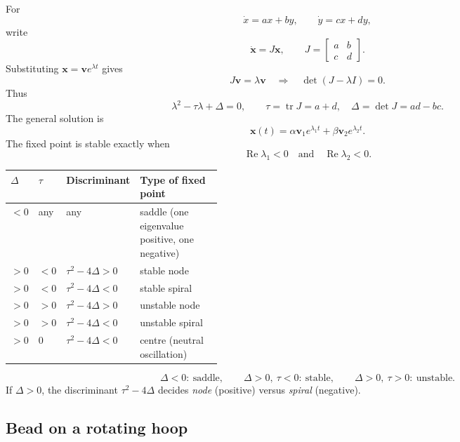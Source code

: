 \documentclass[10.5pt,a4paper]{article}
\newcommand{\x}{\mathbf{x}}
\begin{document}
For
\[
\dot x=ax+by,\qquad \dot y=cx+dy,
\]
write
\[
\dot{\x}=J\x,\qquad
J=\begin{bmatrix}a&b\\c&d\end{bmatrix}.
\]
Substituting \(\x=\mathbf v e^{\lambda t}\) gives
\[
J\mathbf v=\lambda\mathbf v
\quad\Longrightarrow\quad
\det(J-\lambda I)=0.
\]
Thus
\[
\lambda^2-\tau\lambda+\Delta=0,
\qquad
\tau=\operatorname{tr}J=a+d,\quad
\Delta=\det J=ad-bc.
\]
The general solution is
\[
\x(t)=\alpha\mathbf v_1e^{\lambda_1t}+\beta\mathbf v_2e^{\lambda_2t}.
\]
The fixed point is stable exactly when
\[
\operatorname{Re}\lambda_1<0\quad\text{and}\quad \operatorname{Re}\lambda_2<0.
\]

\begin{center}
\begin{tabularx}{\linewidth}{@{}>{\centering\arraybackslash}p{0.10\linewidth}
  >{\centering\arraybackslash}p{0.10\linewidth}
  >{\centering\arraybackslash}p{0.15\linewidth}
  >{\raggedright\arraybackslash}X@{}}
\toprule
\rowcolor{accent!10}
\(\Delta\) & \(\tau\) & Discriminant & Type of fixed point \\
\midrule
\(<0\) & any & any & saddle (one eigenvalue positive, one negative) \\
\(>0\) & \(<0\) & \(\tau^2-4\Delta>0\) & stable node \\
\(>0\) & \(<0\) & \(\tau^2-4\Delta<0\) & stable spiral \\
\(>0\) & \(>0\) & \(\tau^2-4\Delta>0\) & unstable node \\
\(>0\) & \(>0\) & \(\tau^2-4\Delta<0\) & unstable spiral \\
\(>0\) & \(0\) & \(\tau^2-4\Delta<0\) & centre (neutral oscillation) \\
\bottomrule
\end{tabularx}
\end{center}

\begin{keybox}
\[
\Delta<0:\ \text{saddle},
\qquad
\Delta>0,\ \tau<0:\ \text{stable},
\qquad
\Delta>0,\ \tau>0:\ \text{unstable}.
\]
If \(\Delta>0\), the discriminant \(\tau^2-4\Delta\) decides
\emph{node} (positive) versus \emph{spiral} (negative).
\end{keybox}

\subsection{Bead on a rotating hoop}
\end{document}
